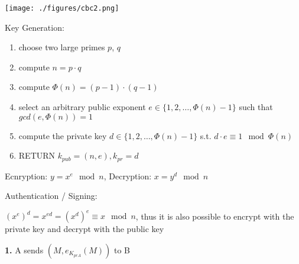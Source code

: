 \documentclass[landscape, a4paper]{article}
\begin{document}
\begin{minipage}[t]{0.2\linewidth}
\begin{betterlist}
\begin{betterlist}
			\texttt{[image: ./figures/cbc2.png]}
		\end{betterlist}
	\end{betterlist}
	\begin{betterlist}
		\item \alert{Key Generation:}
		\begin{enumerate}
			\item choose two large primes $p$, $q$
			\item compute $n = p \cdot q$
			\item compute $\Phi(n) = (p - 1) \cdot (q - 1)$
			\item select an arbitrary public exponent $e \in \{1, 2, \ldots, \Phi(n) - 1\}$ such that $gcd(e, \Phi(n) ) = 1$
			\item compute the private key $d \in \{1, 2, \ldots , \Phi(n) - 1\}$ s.t. $d \cdot e \equiv 1 \mod \Phi(n)$
			\item RETURN $k_{pub} = (n, e), k_{pr} = d$
		\end{enumerate}
		\item \alert{Ecnryption:} $y = x^e \mod n$, \alert{Decryption:} $x = y^d \mod n$
		\item \alert{Authentication / Signing:}
		\begin{betterlist}
			\item $(x^e)^d = x^{ed} = (x^d)^e \equiv x \mod n$, thus it is also possible to encrypt with the private key and decrypt with the public key
			\item[\color{PrimaryColor}\textbf{1.} ] A sends $(M, e_{K_{prA}}(M))$ to B

\end{betterlist}
\end{betterlist}
\end{minipage}
\end{document}
